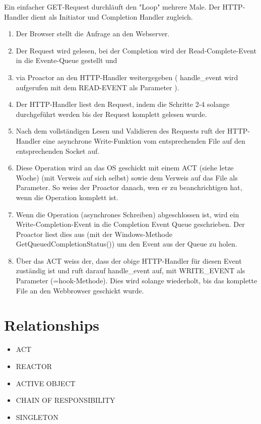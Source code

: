 Ein einfacher GET-Request durchläuft den "Loop" mehrere Male. Der HTTP-Handler dient als Initiator und Completion Handler zugleich.
\begin{enumerate}
  \item Der Browser stellt die Anfrage an den Webserver.
  \item Der Request wird gelesen, bei der Completion wird der Read-Complete-Event in die Evente-Queue gestellt und
  \item via Proactor an den HTTP-Handler weitergegeben ( handle\_event wird aufgerufen mit dem READ-EVENT als Parameter ).
  \item Der HTTP-Handler liest den Request, indem die Schritte 2-4 solange durchgeführt werden bis der Request komplett gelesen wurde.
  \item Nach dem vollständigen Lesen und Validieren des Requests ruft der HTTP-Handler eine asynchrone Write-Funktion vom entsprechenden File auf den entsprechenden Socket auf.
  \item Diese Operation wird an das OS geschickt mit einem ACT (siehe letze Woche) (mit Verweis auf sich selbst) sowie dem Verweis auf das File als Parameter. So weiss der Proactor danach, wen er zu beanchrichtigen hat, wenn die Operation komplett ist.
  \item Wenn die Operation (asynchrones Schreiben) abgeschlossen ist, wird ein Write-Completion-Event in die Completion Event Queue geschrieben. Der Proactor liest dies aus (mit der Windows-Methode GetQueuedCompletionStatus()) um den Event aus der Queue zu holen.
  \item Über das ACT weiss der, dass der obige HTTP-Handler für diesen Event zuständig ist und ruft darauf handle\_event auf, mit WRITE\_EVENT als Parameter (=hook-Methode).
    Dies wird solange wiederholt, bis das komplette File an den Webbrowser geschickt wurde.
\end{enumerate}

\section{Relationships}
\begin{itemize}
  \item ACT
  \item REACTOR
  \item ACTIVE OBJECT
  \item CHAIN OF RESPONSIBILITY
  \item SINGLETON
\end{itemize}

